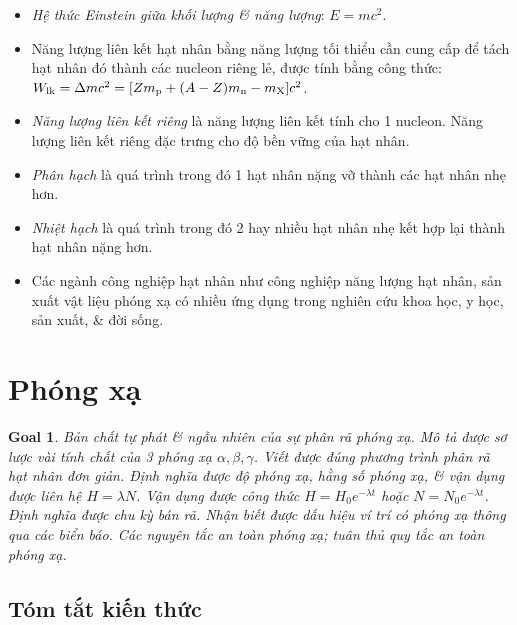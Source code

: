 \documentclass{article}
\newtheorem{goal}{Goal}
\begin{document}
\begin{itemize}
	\item {\it Hệ thức Einstein giữa khối lượng \& năng lượng}: $E = mc^2$.
	\item Năng lượng liên kết hạt nhân bằng năng lượng tối thiểu cần cung cấp để tách hạt nhân đó thành các nucleon riêng lẻ, được tính bằng công thức: $W_{\rm lk} = \Delta mc^2 = [Zm_{\rm p} + (A - Z)m_{\rm n} - m_{\rm X}]c^2$.
	\item {\it Năng lượng liên kết riêng} là năng lượng liên kết tính cho 1 nucleon. Năng lượng liên kết riêng đặc trưng cho độ bền vững của hạt nhân.
	\item {\it Phân hạch} là quá trình trong đó 1 hạt nhân nặng vỡ thành các hạt nhân nhẹ hơn.
	\item {\it Nhiệt hạch} là quá trình trong đó 2 hay nhiều hạt nhân nhẹ kết hợp lại thành hạt nhân nặng hơn.
	\item Các ngành công nghiệp hạt nhân như công nghiệp năng lượng hạt nhân, sản xuất vật liệu phóng xạ có nhiều ứng dụng trong nghiên cứu khoa học, y học, sản xuất, \& đời sống.
\end{itemize}


\section{Phóng xạ}

\begin{goal}
	Bản chất tự phát \& ngẫu nhiên của sự phân rã phóng xạ. Mô tả được sơ lược vài tính chất của 3 phóng xạ $\alpha,\beta,\gamma$. Viết được đúng phương trình phân rã hạt nhân đơn giản. Định nghĩa được độ phóng xạ, hằng số phóng xạ, \& vận dụng được liên hệ $H = \lambda N$. Vận dụng được công thức $H = H_0e^{-\lambda t}$ hoặc $N = N_0e^{-\lambda t}$. Định nghĩa được chu kỳ bán rã. Nhận biết được dấu hiệu ví trí có phóng xạ thông qua các biển báo. Các nguyên tắc an toàn phóng xạ; tuân thủ quy tắc an toàn phóng xạ.
\end{goal}

\subsection{Tóm tắt kiến thức}
\end{document}
